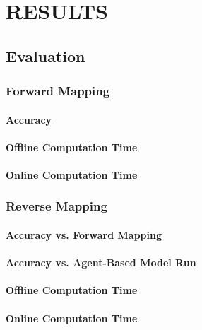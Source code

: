 \chapter{RESULTS}
\thispagestyle{plain}

\label{Results}


\section{Evaluation}

 \subsection{Forward Mapping}

  \subsubsection{Accuracy}

  \subsubsection{Offline Computation Time}

  \subsubsection{Online Computation Time}

 \subsection{Reverse Mapping}

  \subsubsection{Accuracy vs. Forward Mapping}

  \subsubsection{Accuracy vs. Agent-Based Model Run}

  \subsubsection{Offline Computation Time}

  \subsubsection{Online Computation Time}


